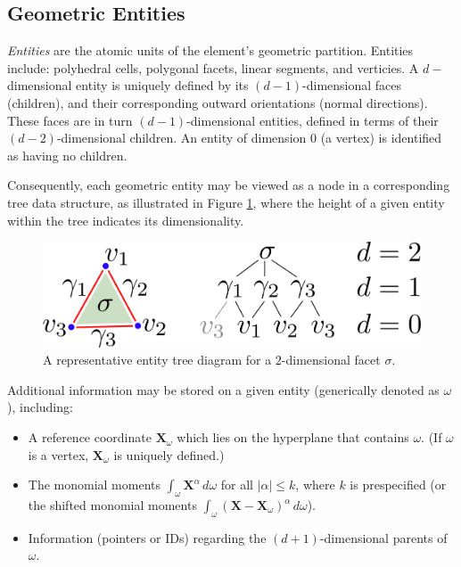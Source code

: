 \subsection*{Geometric Entities}

	\textit{Entities} are the atomic units of the element's geometric partition. Entities include: polyhedral cells, polygonal facets, linear segments, and verticies. A $d-$dimensional entity is uniquely defined by its $(d-1)$-dimensional faces (children), and their corresponding outward orientations (normal directions). These faces are in turn $(d-1)$-dimensional entities, defined in terms of their $(d-2)$-dimensional children. An entity of dimension $0$ (a vertex) is identified as having no children.
	
	Consequently, each geometric entity may be viewed as a node in a corresponding tree data structure, as illustrated in Figure \ref{fig:entity_tree}, where the height of a given entity within the tree indicates its dimensionality.
	\begin{figure} [!ht]
		\centering
		\includegraphics[width = 5.0in]{figures/entity_tree.pdf}
		\caption{A representative entity tree diagram for a $2$-dimensional facet $\sigma$.}
		\label{fig:entity_tree}
	\end{figure}
	
	Additional information may be stored on a given entity (generically denoted as $\omega$), including:
	\begin{itemize}
		\item A reference coordinate $\mathbf{X}_\omega$ which lies on the hyperplane that contains $\omega$. (If $\omega$ is a vertex, $\mathbf{X}_\omega$ is uniquely defined.)
		\item The monomial moments $\int_{\omega} \mathbf{X}^\alpha \, d \omega$ for all $|\alpha| \leq k$, where $k$ is prespecified (or the shifted monomial moments $\int_{\omega} (\mathbf{X}-\mathbf{X}_{\omega})^\alpha \, d \omega$).
		\item Information (pointers or IDs) regarding the $(d+1)$-dimensional parents of $\omega$.
	\end{itemize}
	

